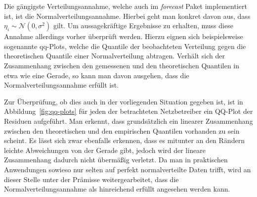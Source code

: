 Die g\"angigste Verteilungsannahme, welche auch im \textit{forecast} Paket implementiert ist, ist die Normalverteilungsannahme.
Hierbei geht man konkret davon aus, dass $\eta_i \sim \mathcal{N}(0, \sigma^2)$ gilt.
Um aussagekr\"aftige Ergebnisse zu erhalten, muss diese Annahme allerdings vorher \"uberpr\"uft werden.
Hierzu eignen sich beispielsweise sogenannte qq-Plots, welche die Quantile der beobachteten Verteilung gegen die theoretischen
Quantile einer Normalverteilung abtragen.
Verh\"alt sich der Zusammenhang zwischen den gemessenen und den theoretischen Quantilen in etwa wie eine Gerade, so kann man
davon ausgehen, dass die Normalverteilungsannahme erf\"ullt ist.

Zur \"Uberpr\"ufung, ob dies auch in der vorliegenden Situation gegeben ist, ist in Abbildung~\ref{fig:qq-plots} f\"ur jeden der
betrachteten Netzbetreiber ein QQ-Plot der Residuen aufgef\"uhrt. Man erkennt, dass grunds\"atzlich ein linearer Zusammenhang
zwischen den theoretischen und den empirischen Quantilen vorhanden zu sein scheint. Es l\"asst sich zwar ebenfalls erkennen,
dass es mitunter an den R\"andern leichte Abweichungen von der Gerade gibt, jedoch wird der lineare Zusammenhang
dadurch nicht \"uberm\"a{\ss}ig verletzt. Da man in praktischen Anwendungen sowieso nur selten auf perfekt normalverteilte Daten
trifft, wird an dieser Stelle unter der Pr\"amisse weitergearbeitet, dass die Normalverteilungsannahme als hinreichend erf\"ullt
angesehen werden kann.
